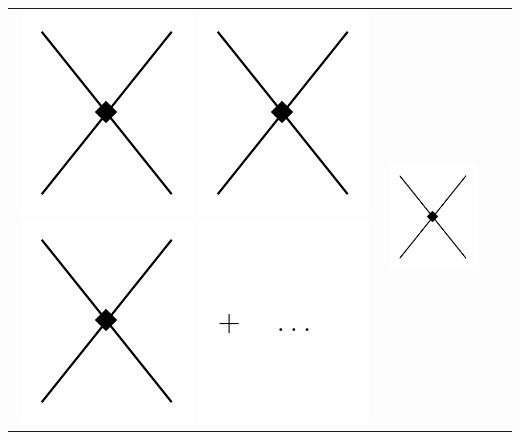 \begin{table}
\begin{tabular}{ c | c | c | c }
{\includegraphics[scale=0.5,page=2]{Introduction/Figures/N3LO}
\includegraphics[scale=0.5,page=3]{Introduction/Figures/N3LO}
\includegraphics[scale=0.5,page=4]{Introduction/Figures/N3LO}
\includegraphics[scale=0.5,page=1]{Introduction/Figures/ellipsis} 
}  &  
\parbox[c][][c]{5.8cm}{\centering
\includegraphics[scale=0.5,page=5]{Introduction/Figures/N3LO}
}
\end{tabular}
\end{table}
